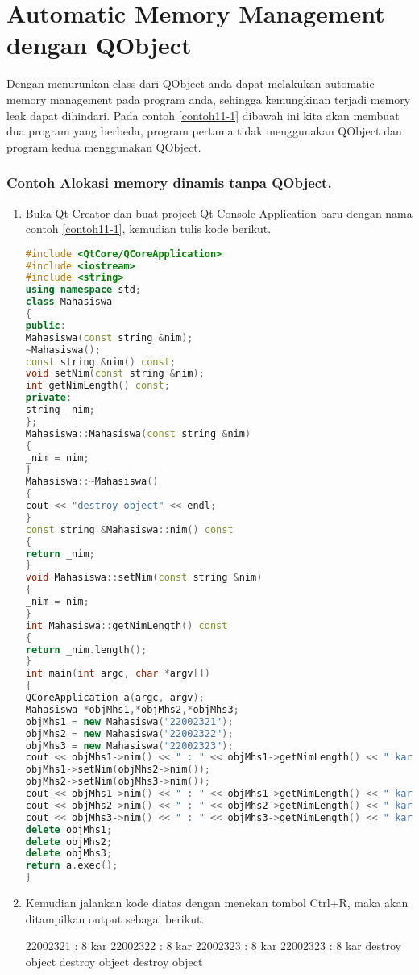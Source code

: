 \section{Automatic Memory Management dengan QObject}\label{automatic-memory-management-dengan-qobject}

Dengan menurunkan class dari QObject anda dapat melakukan automatic
memory management pada program anda, sehingga kemungkinan terjadi memory
leak dapat dihindari. Pada contoh \ref{contoh11-1} dibawah ini kita akan membuat dua
program yang berbeda, program pertama tidak menggunakan QObject dan
program kedua menggunakan QObject.

\subsubsection*{Contoh  Alokasi memory dinamis tanpa QObject.}

\begin{enumerate}

\item
  Buka Qt Creator dan buat project Qt Console Application baru dengan
  nama contoh \ref{contoh11-1}, kemudian tulis kode berikut.

\begin{lstlisting}[language=c++, caption= Alokasi memory dinamis tanpa QObject, label=contoh11-1]
#include <QtCore/QCoreApplication>
#include <iostream>
#include <string>
using namespace std;
class Mahasiswa
{
public:
Mahasiswa(const string &nim);
~Mahasiswa();
const string &nim() const;
void setNim(const string &nim);
int getNimLength() const;
private:
string _nim;
};
Mahasiswa::Mahasiswa(const string &nim)
{
_nim = nim;
}
Mahasiswa::~Mahasiswa()
{
cout << "destroy object" << endl;
}
const string &Mahasiswa::nim() const
{
return _nim;
}
void Mahasiswa::setNim(const string &nim)
{
_nim = nim;
}
int Mahasiswa::getNimLength() const
{
return _nim.length();
}
int main(int argc, char *argv[])
{
QCoreApplication a(argc, argv);
Mahasiswa *objMhs1,*objMhs2,*objMhs3;
objMhs1 = new Mahasiswa("22002321");
objMhs2 = new Mahasiswa("22002322");
objMhs3 = new Mahasiswa("22002323");
cout << objMhs1->nim() << " : " << objMhs1->getNimLength() << " kar" << endl;
objMhs1->setNim(objMhs2->nim());
objMhs2->setNim(objMhs3->nim());
cout << objMhs1->nim() << " : " << objMhs1->getNimLength() << " kar" << endl;
cout << objMhs2->nim() << " : " << objMhs2->getNimLength() << " kar" << endl;
cout << objMhs3->nim() << " : " << objMhs3->getNimLength() << " kar" << endl;
delete objMhs1;
delete objMhs2;
delete objMhs3;
return a.exec();
}
\end{lstlisting}
\item
  Kemudian jalankan kode diatas dengan menekan tombol Ctrl+R, maka akan
  ditampilkan output sebagai berikut.
  
\begin{lcverbatim}
22002321 : 8 kar
22002322 : 8 kar
22002323 : 8 kar
22002323 : 8 kar
destroy object
destroy object
destroy object
\end{lcverbatim}
\end{enumerate}

